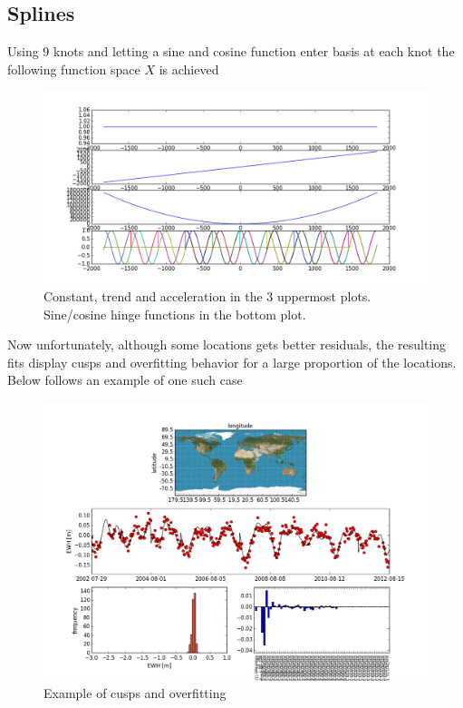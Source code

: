 \subsection{Splines}
Using 9 knots and letting a sine and cosine function enter basis at each knot the following function space $X$ is achieved
\begin{figure}[H]
	\centering
	\includegraphics[width=\textwidth]{figures/splines}
	\caption{Constant, trend and acceleration in the 3 uppermost plots. Sine/cosine hinge functions in the bottom plot.}
	\label{fig:splines}
\end{figure}

Now unfortunately, although some locations gets better residuals, the resulting fits display cusps and overfitting behavior for a large proportion of the locations.
 Below follows an example of one such case

\begin{figure}[H]
	\centering
	\includegraphics[width=\textwidth]{figures/res_splines_bad}
	\caption{Example of cusps and overfitting}
	\label{fig:res_splines}
\end{figure}

